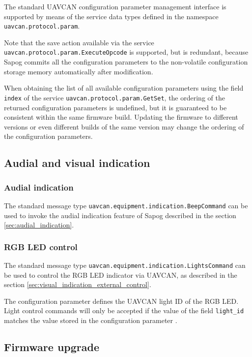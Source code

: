 \documentclass{zubaxdoc}
\begin{document}
The standard UAVCAN configuration parameter management interface is supported
by means of the service data types defined in the namespace \verb|uavcan.protocol.param|.

Note that the save action available via the service \verb|uavcan.protocol.param.ExecuteOpcode|
is supported, but is redundant, because Sapog commits all the configuration parameters
to the non-volatile configuration storage memory automatically after modification.

When obtaining the list of all available configuration parameters using the field \verb|index|
of the service \verb|uavcan.protocol.param.GetSet|, the ordering of the returned configuration
parameters is undefined, but it is guaranteed to be consistent within the same firmware build.
Updating the firmware to different versions or even different builds of the same version
may change the ordering of the configuration parameters.

\subsection{Audial and visual indication}

\subsubsection{Audial indication}

The standard message type \verb|uavcan.equipment.indication.BeepCommand|
can be used to invoke the audial indication feature of Sapog
described in the section \ref{sec:audial_indication}.

\subsubsection{RGB LED control}

The standard message type \verb|uavcan.equipment.indication.LightsCommand|
can be used to control the RGB LED indicator via UAVCAN, as described in the section 
\ref{sec:visual_indication_external_control}.

The configuration parameter  defines the UAVCAN light ID of the RGB LED.
Light control commands will only be accepted if the value of the field \verb|light_id|
matches the value stored in the configuration parameter .

\subsection{Firmware upgrade}
\end{document}

